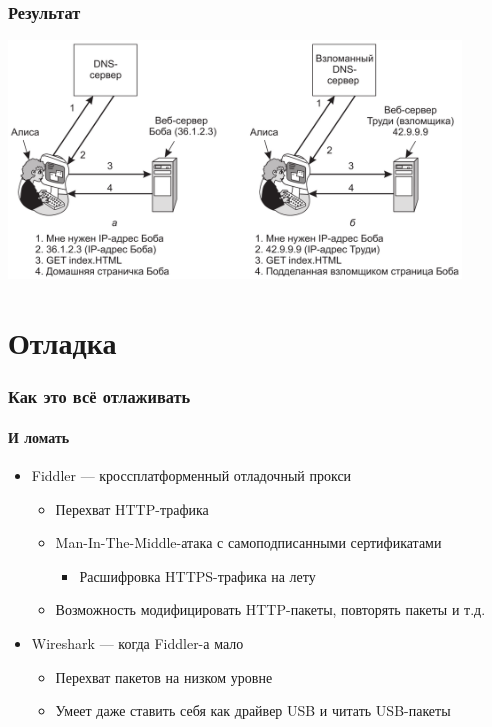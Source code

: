 \documentclass{../cscslides}
\begin{document}
    \begin{frame}
        \frametitle{Результат}
        \begin{center}
            \includegraphics[width=0.9\textwidth]{dnsSpoofingResult.png}
        \end{center}
    \end{frame}

    \section{Отладка}

    \begin{frame}
        \frametitle{Как это всё отлаживать}
        \framesubtitle{И ломать}
        \begin{itemize}
            \item Fiddler --- кроссплатформенный отладочный прокси
            \begin{itemize}
                \item Перехват HTTP-трафика
                \item Man-In-The-Middle-атака с самоподписанными сертификатами
                \begin{itemize}
                    \item Расшифровка HTTPS-трафика на лету
                \end{itemize}
                \item Возможность модифицировать HTTP-пакеты, повторять пакеты и т.д.
            \end{itemize}
            \item Wireshark --- когда Fiddler-а мало
            \begin{itemize}
                \item Перехват пакетов на низком уровне
                \item Умеет даже ставить себя как драйвер USB и читать USB-пакеты
            \end{itemize}
        \end{itemize}
    \end{frame}
\end{document}
